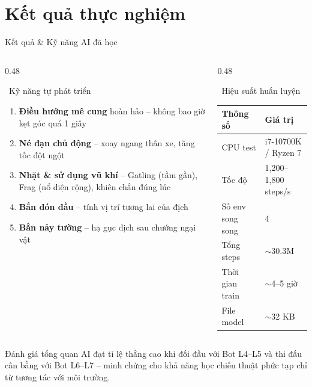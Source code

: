\documentclass[aspectratio=169, 11pt]{beamer}
\begin{document}
\section{Kết quả thực nghiệm}

\begin{frame}{Kết quả \& Kỹ năng AI đã học}
  \begin{columns}[T]
    \begin{column}{0.48\textwidth}
      \begin{block}{\faRobot~Kỹ năng tự phát triển}
        \begin{enumerate}
          \item \textbf{Điều hướng mê cung} hoàn hảo -- không bao giờ kẹt góc quá 1 giây
          \item \textbf{Né đạn chủ động} -- xoay ngang thân xe, tăng tốc đột ngột
          \item \textbf{Nhặt \& sử dụng vũ khí} -- Gatling (tầm gần), Frag (nổ diện rộng), khiên chắn đúng lúc
          \item \textbf{Bắn đón đầu} -- tính vị trí tương lai của địch
          \item \textbf{Bắn nảy tường} -- hạ gục địch sau chướng ngại vật
        \end{enumerate}
      \end{block}
    \end{column}
    \begin{column}{0.48\textwidth}
      \begin{block}{\faTachometerAlt~Hiệu suất huấn luyện}
        \renewcommand{\arraystretch}{1.3}
        \begin{tabular}{l l}
          \toprule
          \textbf{Thông số} & \textbf{Giá trị} \\
          \midrule
          CPU test & i7-10700K / Ryzen 7 \\
          Tốc độ & 1,200--1,800 steps/s \\
          Số env song song & 4 \\
          Tổng steps & $\sim$30.3M \\
          Thời gian train & $\sim$4--5 giờ \\
          File model & $\sim$32 KB \\
          \bottomrule
        \end{tabular}
      \end{block}
    \end{column}
  \end{columns}

  \vspace{6pt}
  \begin{exampleblock}{Đánh giá tổng quan}
    AI đạt tỉ lệ thắng cao khi đối đầu với Bot L4--L5 và thi đấu cân bằng với Bot L6--L7 -- minh chứng cho khả năng học chiến thuật phức tạp chỉ từ tương tác với môi trường.
  \end{exampleblock}
\end{frame}
\end{document}
